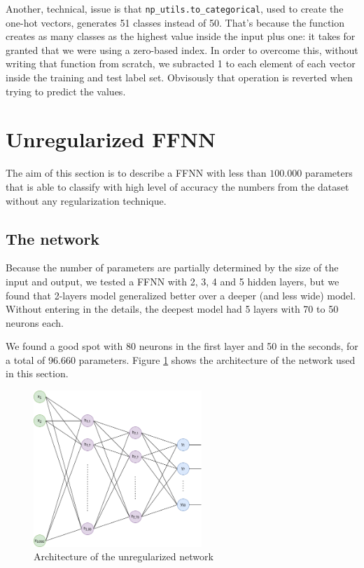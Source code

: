 \documentclass[compsoc]{IEEEtran}
\begin{document}
Another, technical, issue is that \texttt{np\_utils.to\_categorical}, used to create the one-hot vectors, generates 51 classes instead of 50. That's because the function creates as many classes as the highest value inside the input plus one: it takes for granted that we were using a zero-based index. In order
to overcome this, without writing that function from scratch, we subracted 1 to each element of each vector inside the training and test label set.
Obvisously that operation is reverted when trying to predict the values.


\section{Unregularized FFNN}

The aim of this section is to describe a FFNN with less than $100.000$ parameters that is able to classify
with high level of accuracy the numbers from the dataset without any regularization technique. 

\subsection{The network}
Because the number of parameters
are partially determined by the size of the input and output, we tested a FFNN with 2, 3, 4 and 5 hidden layers, but we found that 2-layers model
generalized better over a deeper (and less wide) model. Without entering in the details, the deepest model had 5 layers with 70 to 50 neurons each.\par 


We found a good spot with 80 neurons in the first layer and 50 in the seconds, for a total of 96.660 parameters. 
Figure \ref{fig:noregffnn} shows the architecture of the network used in this section.






\begin{figure}[ht!]
\centering                                                                        
\includegraphics[width=2.5in]{noregffnn.png}
\captionsetup{justification=centering}                                                                                                                                   
\caption{Architecture of the unregularized network}
\label{fig:noregffnn}
\end{figure}
\end{document}
